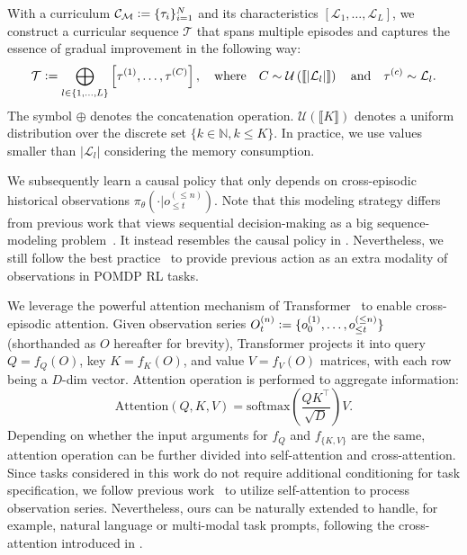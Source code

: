 With a curriculum $\mathcal{C}_\mathcal{M} \vcentcolon= \{\tau_i\}_{i = 1}^N$ and its characteristics $[\mathcal{L}_1, \ldots, \mathcal{L}_L]$, we construct a curricular sequence $\mathcal{T}$ that spans multiple episodes and captures the essence of gradual improvement in the following way:
\begin{equation}
    \mathcal{T} \vcentcolon= \bigoplus_{l \in \{1, \ldots, L\}} \left[\tau^{(1)}, \ldots, \tau^{(C)} \right], \quad  \text{where} \quad C \sim  \mathcal{U}\left(\llbracket \vert \mathcal{L}_l \vert \rrbracket\right) \quad \text{and} \quad \tau^{(c)} \sim \mathcal{L}_l.
\end{equation}
The symbol $\oplus$ denotes the concatenation operation. $\mathcal{U}\left( \llbracket K \rrbracket \right)$ denotes a uniform distribution over the discrete set $\{k \in \mathbb{N}, k\leq K \}$. In practice, we use values smaller than $\vert \mathcal{L}_l \vert$ considering the memory consumption.

We subsequently learn a causal policy that only depends on cross-episodic historical observations $\pi_\theta (\cdot \vert o_{\leq t}^{(\leq n)})$.
Note that this modeling strategy differs from previous work that views sequential decision-making as a big sequence-modeling problem~\citep{chen2021decisiontransformer,janner2021onebigsequence,laskin2023incontext,jiang2022vima}. It instead resembles the causal policy in \citet{openai2022vpt}. Nevertheless, we still follow the best practice~\citep{for-the-win,openai2019dota,fan2022minedojo} to provide previous action as an extra modality of observations in POMDP RL tasks.

We leverage the powerful attention mechanism of Transformer~\citep{vaswani2017attention} to enable cross-episodic attention.
Given observation series $O_t^{(n)} \vcentcolon= \{o_{0}^{(1)},\ldots, o_{\leq t}^{(\leq n)} \}$ (shorthanded as $O$ hereafter for brevity), 
Transformer projects it into query $Q = f_Q(O)$, key $K = f_K (O)$, and value $V = f_V(O)$ matrices, with each row being a $D$-dim vector.
Attention operation is performed to aggregate information:
\begin{equation}
    \text{Attention}(Q, K, V) = \text{softmax}(\frac{QK^\intercal}{\sqrt{D}})V.
\end{equation}
Depending on whether the input arguments for $f_Q$ and $f_{\{K, V\}}$ are the same, attention operation can be further divided into self-attention and cross-attention.
Since tasks considered in this work do not require additional conditioning for task specification, 
we follow previous work~\citep{openai2022vpt,zhu2022viola} to utilize self-attention to process observation series.
Nevertheless, ours can be naturally extended to handle, for example, natural language or multi-modal task prompts, following the cross-attention introduced in \citet{jiang2022vima}.

